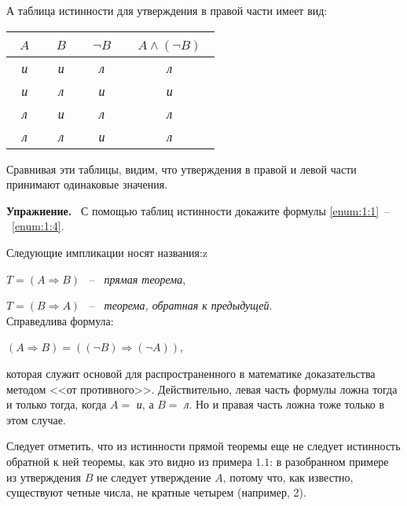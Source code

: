 \documentclass[a4paper,14pt]{article}
\newenvironment{exercise}{\par\medskip\textbf{Упражнение.}~}{\medskip}
\begin{document}
\newpage
\noindent А таблица истинности для утверждения в правой части имеет вид:
\begin{center}
    \begin{tabular}{|c|c cc ccc|}
        \hline
        ~$A$~      & ~$B$~      & \multicolumn{2}{|c|}{~$\neg B$~} & \multicolumn{3}{|c|}{~$A \wedge (\neg B)$~} \\
        \hline
        ~\emph{и}~ & ~\emph{и}~ & \multicolumn{2}{|c|}{~\emph{л}~} & \multicolumn{3}{|c|}{~\emph{л}~}            \\
        \hline
        ~\emph{и}~ & ~\emph{л}~ & \multicolumn{2}{|c|}{~\emph{и}~} & \multicolumn{3}{|c|}{~\emph{и}~}            \\
        \hline
        ~\emph{л}~ & ~\emph{и}~ & \multicolumn{2}{|c|}{~\emph{л}~} & \multicolumn{3}{|c|}{~\emph{л}~}            \\
        \hline
        ~\emph{л}~ & ~\emph{л}~ & \multicolumn{2}{|c|}{~\emph{и}~} & \multicolumn{3}{|c|}{~\emph{л}~}            \\
        \hline
    \end{tabular}
\end{center}
\medskip Сравнивая эти таблицы, видим, что утверждения в правой и левой части принимают одинаковые значения.
\begin{exercise}
    С помощью таблиц истинности докажите формулы \ref{enum:1:1}~--~\ref{enum:1:4}.
\end{exercise}
\par Следующие импликации носят названия:z
\par $T = (A \Rightarrow B)$ ~--~ \emph{прямая теорема},
\par $T = (B \Rightarrow A)$ ~--~ \emph{теорема, обратная к предыдущей}. \\
Справедлива формула:
\begin{center}
    $(A \Rightarrow B) = ((\neg B) \Rightarrow (\neg A))$,
\end{center}
\noindent которая служит основой для распространенного в математике доказательства методом <<от противного>>. Действительно, левая часть формулы ложна тогда и только тогда, когда $A =$ \emph{и}, а $B =$ \emph{л}. Но и правая часть ложна тоже только в этом случае.
\par Следует отметить, что из истинности прямой теоремы еще не следует истинность обратной к ней теоремы, как это видно из примера
$1.1$: в разобранном примере из утверждения $B$ не следует утверждение $A$, потому что, как известно, существуют четные числа, не кратные четырем (например, 2).
\end{document}
